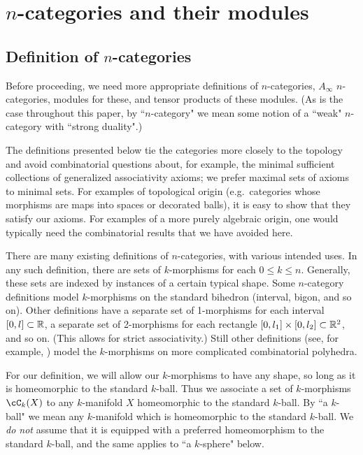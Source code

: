 
\def\xxpar#1#2{\smallskip\noindent{\bf #1} {\it #2} \smallskip}
\def\mmpar#1#2#3{\smallskip\noindent{\bf #1} (#2). {\it #3} \smallskip}

\section{$n$-categories and their modules}
\label{sec:ncats}

\subsection{Definition of $n$-categories}
\label{ss:n-cat-def}

Before proceeding, we need more appropriate definitions of $n$-categories, 
$A_\infty$ $n$-categories, modules for these, and tensor products of these modules.
(As is the case throughout this paper, by ``$n$-category" we mean some notion of
a ``weak" $n$-category with ``strong duality".)

The definitions presented below tie the categories more closely to the topology
and avoid combinatorial questions about, for example, the minimal sufficient
collections of generalized associativity axioms; we prefer maximal sets of axioms to minimal sets.
For examples of topological origin
(e.g.\ categories whose morphisms are maps into spaces or decorated balls), 
it is easy to show that they
satisfy our axioms.
For examples of a more purely algebraic origin, one would typically need the combinatorial
results that we have avoided here.

\medskip

There are many existing definitions of $n$-categories, with various intended uses.
In any such definition, there are sets of $k$-morphisms for each $0 \leq k \leq n$.
Generally, these sets are indexed by instances of a certain typical shape. 
Some $n$-category definitions model $k$-morphisms on the standard bihedron (interval, bigon, and so on).
Other definitions have a separate set of 1-morphisms for each interval $[0,l] \subset \mathbb{R}$, 
a separate set of 2-morphisms for each rectangle $[0,l_1]\times [0,l_2] \subset \mathbb{R}^2$,
and so on.
(This allows for strict associativity.)
Still other definitions (see, for example, \cite{MR2094071})
model the $k$-morphisms on more complicated combinatorial polyhedra.

For our definition, we will allow our $k$-morphisms to have any shape, so long as it is homeomorphic to the standard $k$-ball.
Thus we associate a set of $k$-morphisms $\cC_k(X)$ to any $k$-manifold $X$ homeomorphic 
to the standard $k$-ball.
By ``a $k$-ball" we mean any $k$-manifold which is homeomorphic to the 
standard $k$-ball.
We {\it do not} assume that it is equipped with a 
preferred homeomorphism to the standard $k$-ball, and the same applies to ``a $k$-sphere" below.

